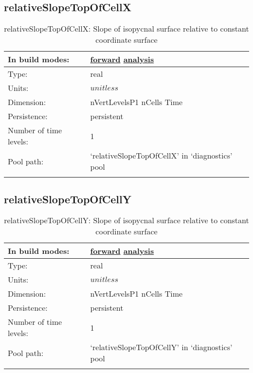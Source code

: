\subsection[relativeSlopeTopOfCellX]{relativeSlopeTopOfCellX}
\label{subsec:var_sec_diagnostics_relativeSlopeTopOfCellX}
\begin{center}
\begin{longtable}{| p{2.0in} | p{4.0in} |}
        \hline 
        In build modes: & \hyperref[subsec:forward_var_tab_diagnostics]{forward} \hyperref[subsec:analysis_var_tab_diagnostics]{analysis} \\
        \hline 
        Type: & real \\
        \hline 
        Units: & $unitless$ \\
        \hline 
        Dimension: & nVertLevelsP1 nCells Time \\
        \hline 
        Persistence: & persistent \\
        \hline 
        Number of time levels: & 1 \\
        \hline 
            Pool path: & `relativeSlopeTopOfCellX' in `diagnostics' pool \\
		 \hline 
    \caption{relativeSlopeTopOfCellX: Slope of isopycnal surface relative to constant coordinate surface}
\end{longtable}
\end{center}
\subsection[relativeSlopeTopOfCellY]{relativeSlopeTopOfCellY}
\label{subsec:var_sec_diagnostics_relativeSlopeTopOfCellY}
\begin{center}
\begin{longtable}{| p{2.0in} | p{4.0in} |}
        \hline 
        In build modes: & \hyperref[subsec:forward_var_tab_diagnostics]{forward} \hyperref[subsec:analysis_var_tab_diagnostics]{analysis} \\
        \hline 
        Type: & real \\
        \hline 
        Units: & $unitless$ \\
        \hline 
        Dimension: & nVertLevelsP1 nCells Time \\
        \hline 
        Persistence: & persistent \\
        \hline 
        Number of time levels: & 1 \\
        \hline 
            Pool path: & `relativeSlopeTopOfCellY' in `diagnostics' pool \\
		 \hline 
    \caption{relativeSlopeTopOfCellY: Slope of isopycnal surface relative to constant coordinate surface}
\end{longtable}
\end{center}
